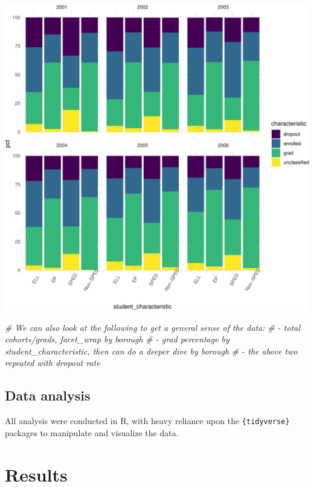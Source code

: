 \documentclass[
  english,
  man, fleqn, noextraspace]{apa6}
\newenvironment{Shaded}{\begin{snugshade}}{\end{snugshade}}
\newcommand{\CommentTok}[1]{\textcolor[rgb]{0.56,0.35,0.01}{\textit{#1}}}
\begin{document}
\includegraphics{EDLD_651_Final_Project_Draft_files/figure-latex/descriptives_of_dataset-1.pdf}

\begin{Shaded}
\begin{Highlighting}[]
\CommentTok{# We can also look at the following to get a general sense of the data:}
\CommentTok{# - total cohorts/grads, facet_wrap by borough}
\CommentTok{# - grad percentage by student_characteristic, then can do a deeper dive by borough}
\CommentTok{# - the above two repeated with dropout rate}
\end{Highlighting}
\end{Shaded}

\hypertarget{data-analysis}{%
\subsection{Data analysis}\label{data-analysis}}

All analysis were conducted in R, with heavy reliance upon the \texttt{\{tidyverse\}} packages to manipulate and visualize the data.

\hypertarget{results}{%
\section{Results}\label{results}}
\end{document}
